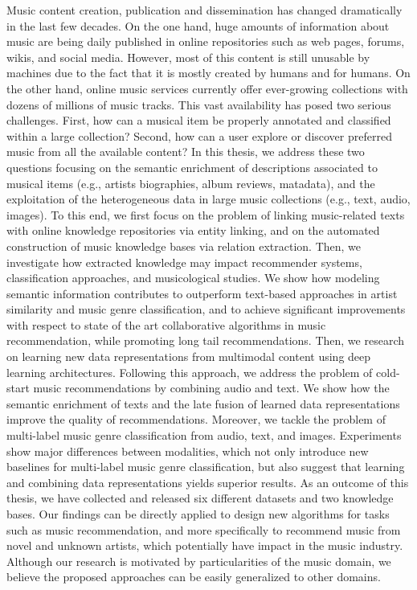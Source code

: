 Music content creation, publication and dissemination has changed dramatically in the last few decades. On the one hand, huge amounts of information about music are being daily published in online repositories such as web pages, forums, wikis, and social media. However, most of this content is still unusable by machines due to the fact that it is mostly created by humans and for humans. On the other hand, online music services currently offer ever-growing collections with dozens of millions of music tracks. This vast availability has posed two serious challenges. First, how can a musical item be properly annotated and classified within a large collection? Second, how can a user explore or discover preferred music from all the available content? In this thesis, we address these two questions focusing on the semantic enrichment of descriptions associated to musical items (e.g., artists biographies, album reviews, matadata), and the exploitation of the heterogeneous data in large music collections (e.g., text, audio, images). To this end, we first focus on the problem of linking music-related texts with online knowledge repositories via entity linking, and on the automated construction of music knowledge bases via relation extraction. Then, we investigate how extracted knowledge may impact recommender systems, classification approaches, and musicological studies. We show how modeling semantic information contributes to outperform text-based approaches in artist similarity and music genre classification, and to achieve significant improvements with respect to state of the art collaborative algorithms in music recommendation, while promoting long tail recommendations. Then, we research on learning new data representations from multimodal content using deep learning architectures. Following this approach, we address the problem of cold-start music recommendations by combining audio and text. We show how the semantic enrichment of texts and the late fusion of learned data representations improve the quality of recommendations. Moreover, we tackle the problem of multi-label music genre classification from audio, text, and images. Experiments show major differences between modalities, which not only introduce new baselines for multi-label music genre classification, but also suggest that learning and combining data representations yields superior results. As an outcome of this thesis, we have collected and released six different datasets and two knowledge bases. Our findings can be directly applied to design new algorithms for tasks such as music recommendation, and more specifically to recommend music from novel and unknown artists, which potentially have impact in the music industry. Although our research is motivated by particularities of the music domain, we believe the proposed approaches can be easily generalized to other domains.
